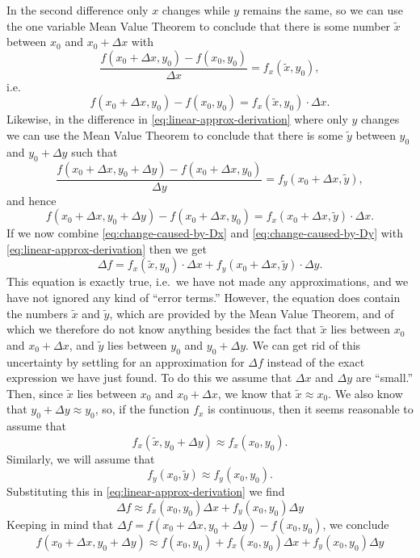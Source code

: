 In the second difference only $x$ changes while $y$ remains the same, so we can
use the one variable Mean Value Theorem to conclude that there is some number
$\tilde x$ between $x_0$ and $x_0+\Delta x$ with
\[
\frac{f(x_0+\Delta x, y_0) - f(x_0, y_0)}{\Delta x} = f_x(\tilde x, y_0),
\]
i.e.
\begin{equation}
  f(x_0+\Delta x, y_0) - f(x_0, y_0) = f_x(\tilde x, y_0) \cdot \Delta x.
  \label{eq:change-caused-by-Dx}
\end{equation}
Likewise, in the difference in \eqref{eq:linear-approx-derivation} where only
$y$ changes we can use the Mean Value Theorem to conclude that there is some
$\tilde y$ between $y_0$ and $y_0+\Delta y$ such that
\[
\frac{f(x_0+\Delta x, y_0+\Delta y) - f(x_0+\Delta x, y_0)}{\Delta y} =
f_y(x_0+\Delta x, \tilde y),
\]
and hence
\begin{equation}
  f(x_0+\Delta x, y_0+\Delta y) - f(x_0+\Delta x, y_0) 
  = f_x(x_0+\Delta x, \tilde y) \cdot \Delta x.
  \label{eq:change-caused-by-Dy}
\end{equation}
If we now combine \eqref{eq:change-caused-by-Dx} and
\eqref{eq:change-caused-by-Dy} with \eqref{eq:linear-approx-derivation} then we
get
\[
\Delta f = f_x(\tilde x, y_0)\cdot\Delta x + f_y(x_0+\Delta x,\tilde
y)\cdot\Delta y.
\]
This equation is exactly true, i.e.~we have not made any approximations, and we
have not ignored any kind of ``error terms.''  However, the equation does
contain the numbers $\tilde x$ and $\tilde y$, which are provided by the Mean
Value Theorem, and of which we therefore do not know anything besides the fact
that $\tilde{x}$ lies between $x_0$ and $x_0 + \Delta x$, and $\tilde{y}$ lies
between $y_0$ and $y_0+\Delta y$.  We can get rid of this uncertainty by
settling for an approximation for $\Delta f$ instead of the exact expression we
have just found.  To do this we assume that $\Delta x$ and $\Delta y$ are
``small.''  Then, since $\tilde{x}$ lies between $x_0$ and $x_0+\Delta x$, we
know that $\tilde x\approx x_0$.  We also know that $y_0+\Delta y \approx y_0$,
so, if the function $f_x$ is continuous, then it seems reasonable to assume that
\begin{equation}
  f_x(\tilde{x}, y_0+\Delta y) \approx f_x(x_0, y_0).
  \label{eq:fx-continuous}
\end{equation}
Similarly, we will assume that
\begin{equation}
  f_y(x_0, \tilde{y}) \approx f_y(x_0, y_0).
  \label{eq:fy-continuous}
\end{equation}
Substituting this in \eqref{eq:linear-approx-derivation} we find
\begin{equation}
  \Delta f \approx f_x(x_0, y_0)\Delta x + f_y(x_0, y_0) \Delta y
  \label{eq:linear-approximation-no-error-Deltaf}
\end{equation}
Keeping in mind that $\Delta f = f(x_0+ \Delta x, y_0+\Delta y)-f(x_0,y_0)$, we
conclude
\begin{equation}
  \label{eq:linear-approximation-no-error}
  f(x_0+\Delta x, y_0+\Delta y)
  \approx
  f(x_0, y_0)+f_x(x_0, y_0)\Delta x + f_y(x_0, y_0) \Delta y
\end{equation}

